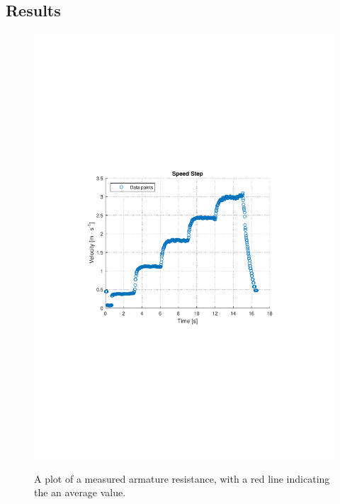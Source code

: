 \subsection{Results}

\begin{figure}[H]
  \centering
  {
    \includegraphics[width=1.2\textwidth]{figures/SpeedStepGainTest.pdf}
  }
  \caption{A plot of a measured armature resistance, with a red line indicating the an average value.}
  \label{armatureResistance}
\end{figure}

